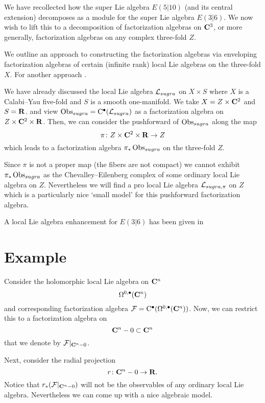 
\parsec[s:weight]


\parsec[s:locallieE510]

We have recollected how the super Lie algebra $E(5|10)$ (and its central extension) decomposes as a module for the super Lie algebra $E(3|6)$. 
We now wish to lift this to a decomposition of factorization algebras on $\mathbf{C}^3$, or more generally, factorization algebras on any complex three-fold $Z$. 

We outline an approach to constructing the factorization algebras via enveloping factorization algebras of certain (infinite rank) local Lie algebras on the three-fold $X$. 
For another approach . 

We have already discussed the local Lie algebra $\mathcal L_{sugra}$ on $X \times S$ where $X$ is a Calabi--Yau five-fold and $S$ is a smooth one-manifold. 
We take $X = Z \times \mathbf{C}^2$ and $S = \mathbf{R}$. 
and view $\operatorname{Obs}_{sugra} = {\rm C}^\bullet(\mathcal L_{sugra})$ as a factorization algebra on $Z \times \mathbf{C}^2 \times \mathbf{R}$. 
Then, we can consider the pushforward of $\operatorname{Obs}_{sugra}$ along the map
\[
\pi \colon Z \times \mathbf{C}^2 \times \mathbf{R} \to Z 
\]
which leads to a factorization algebra $\pi_* \operatorname{Obs}_{sugra}$ on the three-fold $Z$. 

Since $\pi$ is not a proper map (the fibers are not compact) we cannot exhibit $\pi_*\operatorname{Obs}_{sugra}$ as the Chevalley--Eilenberg complex of some ordinary local Lie algebra on $Z$. 
Nevertheless we will find a pro local Lie algebra $\mathcal L_{sugra,\pi}$ on $Z$ which is a particularly nice `small model' for this pushforward factorization algebra.

A local Lie algebra enhancement for $E(3|6)$ has been given in \cite{SWsuca6d} 







\section{Example} 

Consider the holomorphic local Lie algebra on $\mathbf{C}^n$
\[
\Omega^{0,\bullet}(\mathbf{C}^n) 
\]
and corresponding factorization algebra $\mathcal F = {\rm C}^\bullet(\Omega^{0,\bullet}(\mathbf{C}^n))$. 
Now, we can restrict this to a factorization algebra on
\[
\mathbf{C}^n - 0 \subset \mathbf{C}^n
\]
that we denote by $\mathcal F|_{\mathbf{C}^n - 0}$. 

Next, consider the radial projection
\[
r \colon \mathbf{C}^n - 0 \to \mathbf{R} .
\]
Notice that $r_* (\mathcal F|_{\mathbf{C}^n - 0})$ will not be the observables of any ordinary local Lie algebra.
Nevertheless we can come up with a nice algebraic model.  


